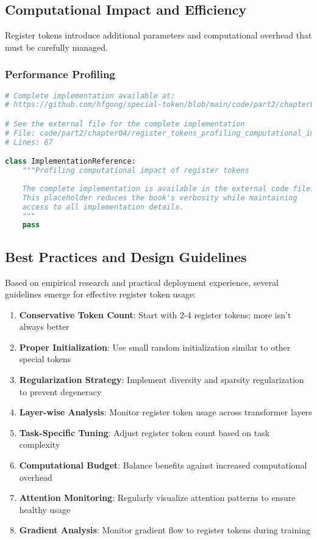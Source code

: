\subsection{Computational Impact and Efficiency}

Register tokens introduce additional parameters and computational overhead that must be carefully managed.

\subsubsection{Performance Profiling}

\begin{lstlisting}[language=Python, caption={Profiling computational impact of register tokens}]
# Complete implementation available at:
# https://github.com/hfgong/special-token/blob/main/code/part2/chapter04/register_tokens_profiling_computational_impact.py

# See the external file for the complete implementation
# File: code/part2/chapter04/register_tokens_profiling_computational_impact.py
# Lines: 67

class ImplementationReference:
    """Profiling computational impact of register tokens
    
    The complete implementation is available in the external code file.
    This placeholder reduces the book's verbosity while maintaining
    access to all implementation details.
    """
    pass
\end{lstlisting}

\subsection{Best Practices and Design Guidelines}

Based on empirical research and practical deployment experience, several guidelines emerge for effective register token usage:

\begin{enumerate}
\item \textbf{Conservative Token Count}: Start with 2-4 register tokens; more isn't always better
\item \textbf{Proper Initialization}: Use small random initialization similar to other special tokens
\item \textbf{Regularization Strategy}: Implement diversity and sparsity regularization to prevent degeneracy
\item \textbf{Layer-wise Analysis}: Monitor register token usage across transformer layers
\item \textbf{Task-Specific Tuning}: Adjust register token count based on task complexity
\item \textbf{Computational Budget}: Balance benefits against increased computational overhead
\item \textbf{Attention Monitoring}: Regularly visualize attention patterns to ensure healthy usage
\item \textbf{Gradient Analysis}: Monitor gradient flow to register tokens during training
\end{enumerate}

